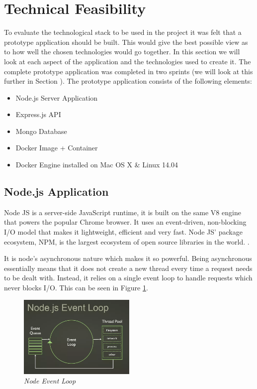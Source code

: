 \section{Technical Feasibility}
\label{sec:feasibility}
To evaluate the technological stack to be used in the project it was felt that a prototype application should be built. This would give the best possible view as to how well the chosen technologies would go together. In this section we will look at each aspect of the application and the technologies used to create it. The complete prototype application was completed in two sprints (we will look at this further in Section \label{sec:work_done}). The prototype application consists of the following elements:

\begin{itemize}
  \item Node.js Server Application
  \item Express.js API
	\item Mongo Database
  \item Docker Image + Container
  \item Docker Engine installed on Mac OS X \& Linux 14.04 
\end{itemize}

\subsection{Node.js Application}
\label{sub:nodejs}
Node JS is a server-side JavaScript runtime, it is built on the same V8 engine that powers the popular Chrome browser. It uses an event-driven, non-blocking I/O model that makes it lightweight, efficient and very fast. Node JS' package ecosystem, NPM, is the largest ecosystem of open source libraries in the world. \citep{Nodejs.org2016}.

It is node's asynchronous nature which makes it so powerful. Being asynchronous essentially means that it does not create a new thread every time a request needs to be dealt with. Instead, it relies on a single event loop to handle requests which never blocks I/O. This can be seen in Figure \ref{fig:event_loop}.

\begin{figure}[!ht]
\centering
\includegraphics*[width=0.5\textwidth]{images/event_loop}
\caption{\em Node Event Loop}
\label{fig:event_loop}
\end{figure}

